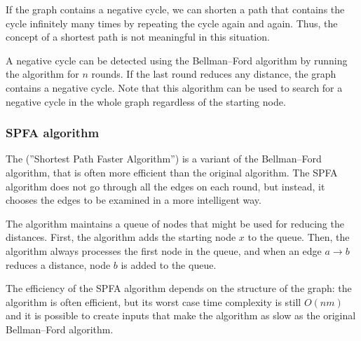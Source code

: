 If the graph contains a negative cycle,
we can shorten a path that contains the cycle
infinitely many times by repeating the cycle
again and again.
Thus, the concept of a shortest path
is not meaningful in this situation.

A negative cycle can be detected
using the Bellman–Ford algorithm by
running the algorithm for $n$ rounds.
If the last round reduces any distance,
the graph contains a negative cycle.
Note that this algorithm can be used to
search for
a negative cycle in the whole graph
regardless of the starting node.

\subsubsection{SPFA algorithm}


The  (''Shortest Path Faster Algorithm'') \cite{fan94}
is a variant of the Bellman–Ford algorithm,
that is often more efficient than the original algorithm.
The SPFA algorithm does not go through all the edges on each round,
but instead, it chooses the edges to be examined
in a more intelligent way.

The algorithm maintains a queue of nodes that might
be used for reducing the distances.
First, the algorithm adds the starting node $x$
to the queue.
Then, the algorithm always processes the
first node in the queue, and when an edge
$a \rightarrow b$ reduces a distance,
node $b$ is added to the queue.
% 
% 

The efficiency of the SPFA algorithm depends
on the structure of the graph:
the algorithm is often efficient,
but its worst case time complexity is still
$O(nm)$ and it is possible to create inputs
that make the algorithm as slow as the
original Bellman–Ford algorithm.

